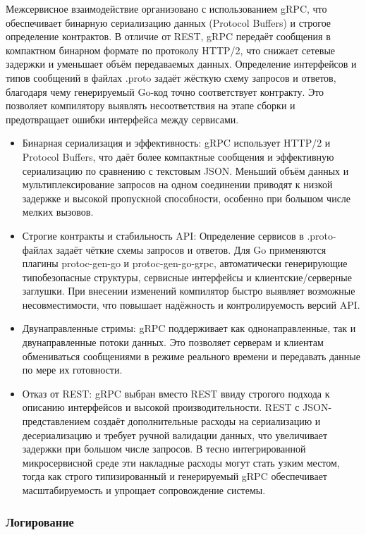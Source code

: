 Межсервисное взаимодействие организовано с использованием gRPC, что обеспечивает бинарную сериализацию данных (Protocol Buffers) и строгое определение контрактов. В отличие от REST, gRPC передаёт сообщения в компактном бинарном формате по протоколу HTTP/2, что снижает сетевые задержки и уменьшает объём передаваемых данных. Определение интерфейсов и типов сообщений в файлах .proto задаёт жёсткую схему запросов и ответов, благодаря чему генерируемый Go-код точно соответствует контракту. Это позволяет компилятору выявлять несоответствия на этапе сборки и предотвращает ошибки интерфейса между сервисами.

\begin{itemize}
    \item Бинарная сериализация и эффективность: gRPC использует HTTP/2 и Protocol Buffers, что даёт более компактные сообщения и эффективную сериализацию по сравнению с текстовым JSON. Меньший объём данных и мультиплексирование запросов на одном соединении приводят к низкой задержке и высокой пропускной способности, особенно при большом числе мелких вызовов.
    \item Строгие контракты и стабильность API: Определение сервисов в .proto-файлах задаёт чёткие схемы запросов и ответов. Для Go применяются плагины protoc-gen-go и protoc-gen-go-grpc, автоматически генерирующие типобезопасные структуры, сервисные интерфейсы и клиентские/серверные заглушки. При внесении изменений компилятор быстро выявляет возможные несовместимости, что повышает надёжность и контролируемость версий API.
    \item Двунаправленные стримы: gRPC поддерживает как однонаправленные, так и двунаправленные потоки данных. Это позволяет серверам и клиентам обмениваться сообщениями в режиме реального времени и передавать данные по мере их готовности.
    \item Отказ от REST: gRPC выбран вместо REST ввиду строгого подхода к описанию интерфейсов и высокой производительности. REST с JSON-представлением создаёт дополнительные расходы на сериализацию и десериализацию и требует ручной валидации данных, что увеличивает задержки при большом числе запросов. В тесно интегрированной микросервисной среде эти накладные расходы могут стать узким местом, тогда как строго типизированный и генерируемый gRPC обеспечивает масштабируемость и упрощает сопровождение системы.
\end{itemize}

\subsubsection*{Логирование}

